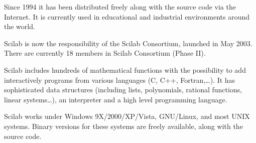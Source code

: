 Since 1994 it has been distributed freely along with the source code via the Internet. It is currently used in educational and industrial environments around the world.

Scilab is now the responsibility of the Scilab Consortium, launched in May 2003. There are currently 18 members in Scilab Consortium (Phase II).

Scilab includes hundreds of mathematical functions with the possibility to add interactively programs from various languages (C, C++, Fortran,\dots). It has sophisticated data structures (including lists, polynomials, rational functions, linear systems\dots), an interpreter and a high level programming language.

Scilab works under Windows 9X/2000/XP/Vista, GNU/Linux, and most UNIX systems. Binary versions for these systems are freely available, along with the source code.